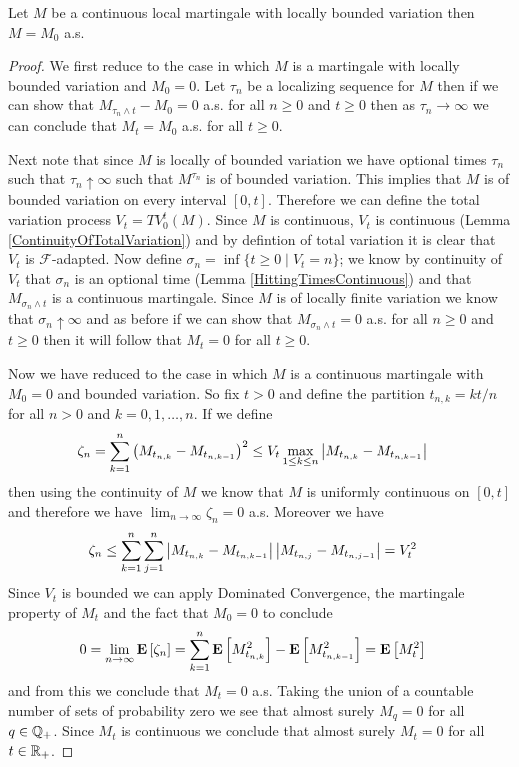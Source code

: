 \begin{lem}\label{ContinuousLocalMartingaleBoundedVariation}Let $M$ be a continuous local martingale with locally bounded variation then $M = M_0$ a.s.
\end{lem}
\begin{proof}
We first reduce to the case in which $M$ is a martingale with locally bounded variation and $M_0=0$.  Let $\tau_n$ be a localizing sequence for $M$ then if we can show that $M_{\tau_n \wedge t} - M_0=0$ a.s. for all $n \geq 0$ and $t \geq 0$ then as $\tau_n \to \infty$ we can conclude that $M_t = M_0$ a.s. for all $t \geq 0$.

Next note that since $M$ is locally of bounded variation we have optional times $\tau_n$ such that $\tau_n \uparrow \infty$ such that $M^{\tau_n}$ is of bounded variation.  This implies that $M$ is of bounded variation on every interval $[0,t]$.  Therefore we can define the total variation process $V_t = TV_0^t(M)$.  Since $M$ is continuous, $V_t$ is continuous (Lemma \ref{ContinuityOfTotalVariation}) and by defintion of total variation it is clear that $V_t$ is $\mathcal{F}$-adapted.  Now define $\sigma_n = \inf \lbrace t \geq 0 \mid V_t = n \rbrace$; we know by continuity of $V_t$ that $\sigma_n$ is an optional time (Lemma \ref{HittingTimesContinuous}) and that $M_{\sigma_n \wedge t}$ is a continuous martingale.  Since $M$ is of locally finite variation we know that $\sigma_n \uparrow \infty$ and as before if we can show that $M_{\sigma_n \wedge t}=0$ a.s. for all $n \geq 0$ and $t \geq 0$ then it will follow that $M_t = 0$ for all $t \geq 0$.

Now we have reduced to the case in which $M$ is a continuous martingale with $M_0=0$ and bounded variation.  So fix $t > 0$ and define the partition $t_{n,k} = kt/n$ for all $n>0$ and $k=0, 1, \dotsc, n$.  If we define
\begin{align*}
\zeta_n &= \sum_{k=1}^n \left(M_{t_{n,k}} - M_{t_{n,k-1}}\right)^2 \leq V_t \max_{1 \leq k \leq n} \left \vert M_{t_{n,k}} - M_{t_{n,k-1}} \right \vert
\end{align*}
then using the continuity of $M$ we know that $M$ is uniformly continuous on $[0,t]$ and therefore we have $\lim_{n \to \infty} \zeta_n = 0$ a.s.  Moreover we have
\begin{align*}
\zeta_n &\leq \sum_{k=1}^n \sum_{j=1}^n \left \vert M_{t_{n,k}} - M_{t_{n,k-1}} \right \vert \left \vert M_{t_{n,j}} - M_{t_{n,j-1}} \right \vert = V_t^2
\end{align*}
Since $V_t$ is bounded we can apply Dominated Convergence, the martingale property of $M_t$ and the fact that $M_0=0$ to conclude
\begin{align*}
0 &= \lim_{n \to \infty} \textbf{E}\left[\zeta_n\right] = \sum_{k=1}^n \textbf{E}\left[M_{t_{n,k}}^2\right] - \textbf{E}\left[M_{t_{n,k-1}}^2\right] = \textbf{E}\left[M_t^2\right]
\end{align*}
and from this we conclude that $M_t = 0$ a.s.  Taking the union of a countable number of sets of probability zero we see that almost surely $M_q = 0$ for all $q \in \mathbb{Q}_+$.  Since $M_t$ is continuous we conclude that almost surely $M_t = 0$ for all $t \in \mathbb{R}_+$.
\end{proof}

